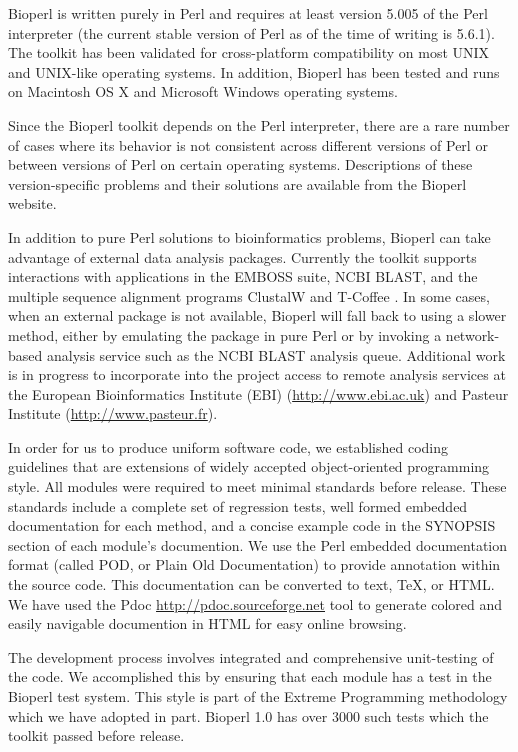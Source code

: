 \documentclass[12pt]{article}
\begin{document}
Bioperl is written purely in Perl and requires at least version 5.005
of the Perl interpreter (the current stable version of Perl as of the
time of writing is 5.6.1).  The toolkit has been validated for
cross-platform compatibility on most UNIX and UNIX-like operating
systems.  In addition, Bioperl has been tested and runs on Macintosh
OS X and Microsoft Windows operating systems.  

Since the Bioperl toolkit depends on the Perl interpreter, there are a
rare number of cases where its behavior is not consistent across
different versions of Perl or between versions of Perl on certain
operating systems.  Descriptions of these version-specific problems
and their solutions are available from the Bioperl website.

In addition to pure Perl solutions to bioinformatics problems, Bioperl
can take advantage of external data analysis packages.  Currently the
toolkit supports interactions with applications in the EMBOSS
\cite{emboss} suite, NCBI BLAST, and the multiple sequence alignment
programs ClustalW \cite{clustalw} and T-Coffee \cite{tcoffee}.  In
some cases, when an external package is not available, Bioperl will
fall back to using a slower method, either by emulating the package in
pure Perl or by invoking a network-based analysis service such as the
NCBI BLAST analysis queue.  Additional work is in progress to
incorporate into the project access to remote analysis services at the
European Bioinformatics Institute (EBI) (\url{http://www.ebi.ac.uk}) and
Pasteur Institute (\url{http://www.pasteur.fr}).

In order for us to produce uniform software code, we established
coding guidelines that are extensions of widely accepted
object-oriented programming style.  All modules were required to meet
minimal standards before release.  These standards include a complete
set of regression tests, well formed embedded documentation for each
method, and a concise example code in the SYNOPSIS section of each
module's documention.  We use the Perl embedded documentation format
(called POD, or Plain Old Documentation) to provide annotation within
the source code.  This documentation can be converted to text, TeX, or
HTML.  We have used the Pdoc \url{http://pdoc.sourceforge.net} tool to
generate colored and easily navigable documention in HTML for easy
online browsing.

The development process involves integrated and comprehensive
unit-testing of the code.  We accomplished this by ensuring that each
module has a test in the Bioperl test system.  This style is part of
the Extreme Programming methodology \cite{xprogramming} which we have
adopted in part.  Bioperl 1.0 has over 3000 such tests which the toolkit
passed before release.
\end{document}
